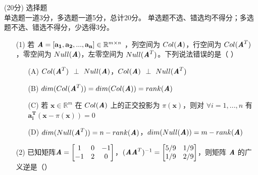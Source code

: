 \documentclass[12pt,a4paper,openany,twoside]{ctexbook}
\begin{document}
\begin{exercise}(20分)
	选择题\\
	单选题一道3分，多选题一道5分，总计20分。
	单选题不选、错选均不得分；多选题不选、错选不得分，少选得3分。

	\begin{itemize}
		\item [(1)]  若 $\boldsymbol{\mathit{A}}=[\mathbf{a_1},\mathbf{a_2},...,\mathbf{a_n}]\in {\mathbb{R}}^{m \times n}$ ，列空间为 $Col(\boldsymbol{\mathit{A}})$，行空间为 $Col(\boldsymbol{\mathit{A}}^T)$，零空间为 $Null(\boldsymbol{\mathit{A}})$，左零空间为  $Null(\boldsymbol{\mathit{A}}^T)$。下列说法错误的是（ \quad ）
		\begin{itemize}
			\item [(A)]  $Col(\boldsymbol{\mathit{A}}^T)$ $\perp$ $Null(\boldsymbol{\mathit{A}})$，$Col(\boldsymbol{\mathit{A}}) $ $\perp$ $Null(\boldsymbol{\mathit{A}}^T )$
			\item [(B)] $dim(Col(\boldsymbol{\mathit{A}}^T))=dim(Col(\boldsymbol{\mathit{A}}))=rank(\boldsymbol{\mathit{A}})$
			\item [(C)] 若 $\mathbf{x}\in {\mathbb{R}}^{m}$ 在 $Col(\boldsymbol{\mathit{A}})$ 上的正交投影为 $\pi(\mathbf{x})$，则对 $\forall i=1,...,n$ 有$\mathbf{a_i^T}(\mathbf{x}-\pi(\mathbf{x}))=0$
			\item [(D)] $dim(Null(\boldsymbol{\mathit{A}}^T))=n-rank(\boldsymbol{\mathit{A}})$，$dim(Null(\boldsymbol{\mathit{A}}))=m-rank(\boldsymbol{\mathit{A}})$
		\end{itemize}

		\item [(2)] 已知矩阵$\boldsymbol{\mathit{A}}=\begin{bmatrix}  
			1 & 0 & -1\\  
			 -1 & 2 & 0 \\  
			\end{bmatrix}$，$(\boldsymbol{\mathit{A}}\boldsymbol{\mathit{A}}^T)^{-1}=\begin{bmatrix}  
			5/9 & 1/9\\  
			1/9 & 2/9\\  
			\end{bmatrix}$，则矩阵 $\boldsymbol{\mathit{A}}$ 的广义逆是（\quad）


\end{itemize}
\end{exercise}
\end{document}
